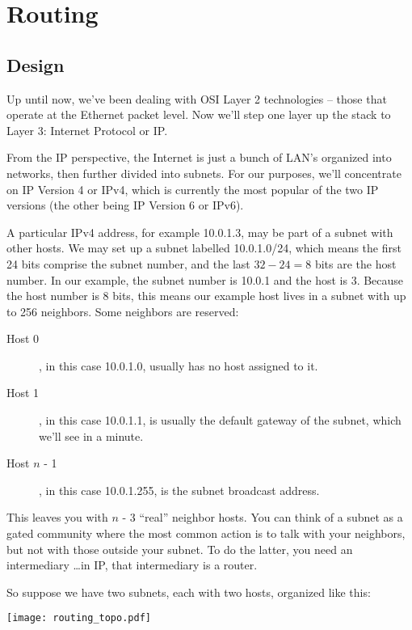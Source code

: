
\chapter{Routing}

\section{Design}
\label{routing:design}

Up until now, we've been dealing with OSI Layer 2 technologies -- those that operate at the
Ethernet packet level.  Now we'll step one layer up the stack to Layer 3: Internet Protocol
or IP.  

From the IP perspective, the Internet is just a bunch of LAN's organized into networks, 
then further divided into subnets.  For our purposes, we'll concentrate on
IP Version 4 or IPv4, which is currently the most popular of the two IP versions (the other being
IP Version 6 or IPv6).  

A particular IPv4 address, for example 10.0.1.3, may be part of a subnet
with other hosts.  We may set up a subnet labelled 10.0.1.0/24, which means the first 24 bits
comprise the subnet number, and the last $32 - 24 = 8$ bits are the host number.  In our example, the
subnet number is 10.0.1 and the host is 3.  Because the host number is 8 bits, this means our example
host lives in a subnet with up to 256 neighbors.  Some neighbors are reserved:

\begin{description}
\item[Host 0], in this case 10.0.1.0, usually has no host assigned to it. 
\item[Host 1], in this case 10.0.1.1, is usually the default gateway of the subnet, which we'll see in 
a minute.
\item[Host $n$ - 1], in this case 10.0.1.255, is the subnet broadcast address.
\end{description}

This leaves you with $n$ - 3 ``real'' neighbor hosts.  You can think of a subnet as a gated community
where the most common action is to talk with your neighbors, but not with those outside your
subnet.  To do the latter, you need an intermediary \ldots in IP, that intermediary is a router.

So suppose we have two subnets, each with two hosts, organized like this:

\texttt{[image: routing\_topo.pdf]}

